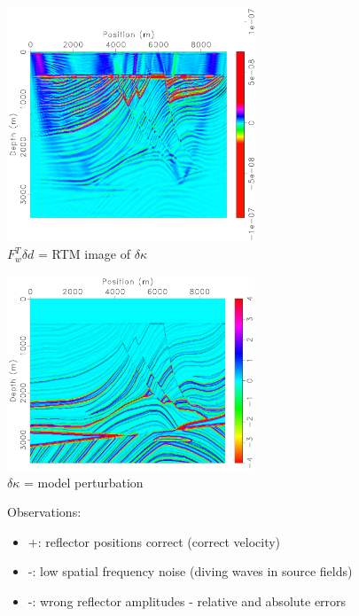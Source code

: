\documentclass[xcolor=dvipsnames,12pt,aspectratio=169]{beamer}
\begin{document}
\begin{frame}
\vspace{-1.0cm}
\begin{center}
\includegraphics[height=7cm]{Fig/fine1mbulk}\\
$F_w^T\delta d$ = RTM image of $\delta \kappa$  
\end{center}
\end{frame}

\begin{frame}
\vspace{-0.7cm}
\begin{center}
\includegraphics[height=5.8cm]{Fig/fine1dbulk}\\
$\delta \kappa$ = model perturbation
\end{center}
\end{frame}

\begin{frame}
Observations:

\begin{itemize}
\item +: reflector positions correct (correct velocity)
\item -: low spatial frequency noise (diving waves in source fields)
\item -: {\color{blue} wrong reflector amplitudes - relative and absolute errors}
\end{itemize}

\end{frame}
\end{document}
